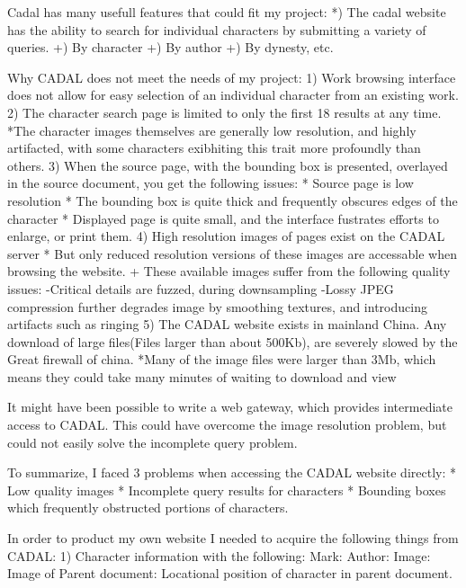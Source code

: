     Cadal has many usefull features that could fit my project:
        *)  The cadal website has the ability to search for individual characters by submitting a variety of queries.
            +)  By character
            +)  By author
            +)  By dynesty, etc.


    Why CADAL does not meet the needs of my project:
        1)  Work browsing interface does not allow for easy selection of an individual character from an existing work.
        2)  The character search page is limited to only the first 18 results at any time.
            *The character images themselves are generally low resolution, and highly artifacted, with some characters exibhiting this trait more profoundly than others.
        3)  When the source page, with the bounding box is presented, overlayed in the source document, you get the following issues:
            *  Source page is low resolution
            *  The bounding box is quite thick and frequently obscures edges of the character
            *  Displayed page is quite small, and the interface fustrates efforts to enlarge, or print them.
        4)  High resolution images of pages exist on the CADAL server
            * But only reduced resolution versions of these images are accessable when browsing the website.
                + These available images suffer from the following quality issues:
                    -Critical details are fuzzed, during downsampling
                    -Lossy JPEG compression further degrades image by smoothing textures, and introducing artifacts such as ringing
        5)  The CADAL website exists in mainland China.  Any download of large files(Files larger than about 500Kb), are severely slowed by the Great firewall of china.
            *Many of the image files were larger than 3Mb, which means they could take many minutes of waiting to download and view
        
        
    It might have been possible to write a web gateway, which provides intermediate access to CADAL.  This could have overcome the image resolution problem, but could not easily solve the incomplete query problem.
    
    To summarize, I faced 3 problems when accessing the CADAL website directly:
        *  Low quality images
        *  Incomplete query results for characters
        *  Bounding boxes which frequently obstructed portions of characters.
                    



    In order to product my own website I needed to acquire the following things from CADAL:
        1)  Character information with the following:
            Mark:
            Author:
            Image:
            Image of Parent document:
            Locational position of character in parent document.
        
